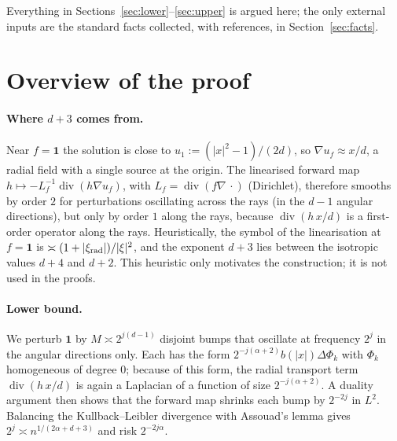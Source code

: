 \documentclass[11pt]{article}
\theoremstyle{definition}
\theoremstyle{remark}
\newcommand{\one}{\mathbf 1}
\newcommand{\dv}{\operatorname{div}}
\begin{document}
Everything in Sections~\ref{sec:lower}--\ref{sec:upper} is argued here; the only external inputs are the standard facts collected, with references, in Section~\ref{sec:facts}.


\section{Overview of the proof}

\paragraph{Where $d+3$ comes from.} Near $f=\one$ the solution is close to $u_1:=(|x|^2-1)/(2d)$, so $\nabla u_f\approx x/d$, a radial field with a single source at the origin. The linearised forward map $h\mapsto -L_f^{-1}\dv(h\nabla u_f)$, with $L_f=\dv(f\nabla\,\cdot)$ (Dirichlet), therefore smooths by order $2$ for perturbations oscillating across the rays (in the $d-1$ angular directions), but only by order $1$ along the rays, because $\dv(h\,x/d)$ is a first-order operator along the rays. Heuristically, the symbol of the linearisation at $f=\one$ is $\asymp(1+|\xi_{\rm rad}|)/|\xi|^2$, and the exponent $d+3$ lies between the isotropic values $d+4$ and $d+2$. This heuristic only motivates the construction; it is not used in the proofs.

\paragraph{Lower bound.} We perturb $\one$ by $M\asymp2^{j(d-1)}$ disjoint bumps that oscillate at frequency $2^j$ in the angular directions only. Each has the form $2^{-j(\alpha+2)}b(|x|)\Delta\Phi_k$ with $\Phi_k$ homogeneous of degree $0$; because of this form, the radial transport term $\dv(h\,x/d)$ is again a Laplacian of a function of size $2^{-j(\alpha+2)}$. A duality argument then shows that the forward map shrinks each bump by $2^{-2j}$ in $L^2$. Balancing the Kullback--Leibler divergence with Assouad's lemma gives $2^j\asymp n^{1/(2\alpha+d+3)}$ and risk $2^{-2j\alpha}$.
\end{document}
